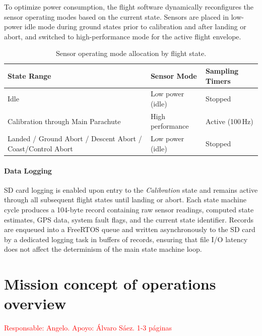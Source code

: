 \documentclass[11pt, a4paper]{article} %
\begin{document}
To optimize power consumption, the flight software dynamically reconfigures the sensor operating modes based on the current state. Sensors are placed in low-power idle mode during ground states prior to calibration and after landing or abort, and switched to high-performance mode for the active flight envelope.

\begin{table}[H]
\centering
\caption{Sensor operating mode allocation by flight state.}
\label{tab:sensor_modes}
\begin{tabularx}{\textwidth}{l l X}
\toprule
\textbf{State Range} & \textbf{Sensor Mode} & \textbf{Sampling Timers} \\
\midrule
Idle & Low power (idle) & Stopped \\
Calibration through Main Parachute & High performance & Active (100\,Hz) \\
Landed / Ground Abort / Descent Abort / Coast/Control Abort & Low power (idle) & Stopped \\
\bottomrule
\end{tabularx}
\end{table}

\paragraph{Data Logging}

SD card logging is enabled upon entry to the \emph{Calibration} state and remains active through all subsequent flight states until landing or abort. Each state machine cycle produces a 104-byte record containing raw sensor readings, computed state estimates, GPS data, system fault flags, and the current state identifier. Records are enqueued into a FreeRTOS queue and written asynchronously to the SD card by a dedicated logging task in buffers of  records, ensuring that file I/O latency does not affect the determinism of the main state machine loop.

\section{Mission concept of operations overview} 

\textcolor{red}{Responsable: Angelo. Apoyo: Álvaro Sáez. 1-3 páginas}
\end{document}
